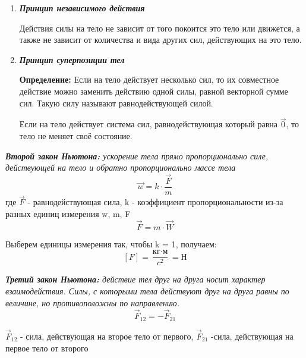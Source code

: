 \documentclass[../main.tex]{subfiles}
\begin{document}
\begin{enumerate}
    \item \textbf{\textit{Принцип независимого действия }}

          Действия силы на тело не зависит от того покоится это тело или движется, а также не зависит от количества и вида других сил, действующих на это тело.
          \newpage
    \item \textbf{\textit{Принцип суперпозиции тел}}

          \textbf{Определение:} Если на тело действует несколько сил, то их совместное действие можно заменить действию одной силы, равной векторной сумме сил. Такую силу называют равнодействующей силой.

          Если на тело действует система сил, равнодействующая который равна $\vec 0$, то тело не меняет своё состояние.
\end{enumerate}
\textit{\textbf{Второй закон Ньютона:} ускорение тела прямо пропорционально силе, действующей на тело и обратно пропорционально массе тела} \[ \vec w = k \cdot \frac{\vec F}{m} \] где $\vec F$ - равнодействующая сила, k - коэффициент пропорциональности из-за разных единиц измерения w, m, F
\[ \vec F = m \cdot \vec W\]

Выберем единицы измерения так, чтобы k = 1, получаем:
\[[F] = \frac{\text{кг}\cdot\text{м}}{c^2} = \text{Н}\]

\textit{\textbf{Третий закон Ньютона:} действие тел друг на друга носит характер взаимодействия. Силы, с которыми тела действуют друг на друга равны по величине, но противоположны по направлению.}
\[\vec F_{12} = - \vec F_{21}\]

$\vec F_{12}$ - сила, действующая на второе тело от первого, $\vec F_{21}$ -сила, действующая на первое тело от второго
\end{document}
